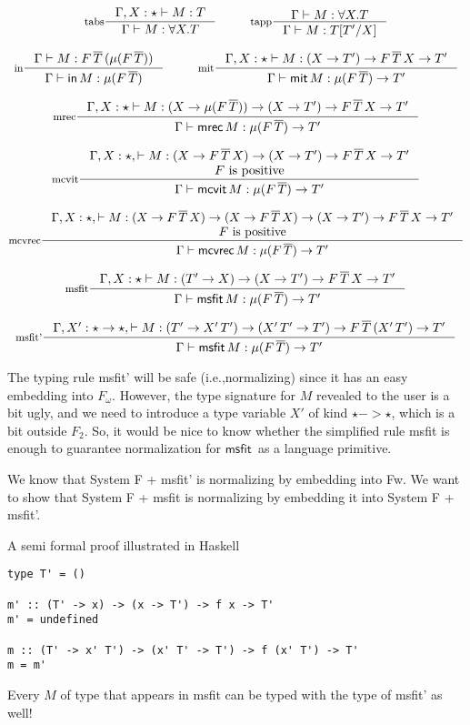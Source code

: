 \documentclass[a4paper,12pt]{book}
\newcommand{\Fw}[0]{\ensuremath{F_\omega}}
\newcommand{\ie}[0]{{i.e.},\;}
\newcommand{\miter}[0]{\ensuremath{\mathsf{mit}}}
\newcommand{\mrec}[0]{\ensuremath{\mathsf{mrec}}}
\newcommand{\mcvit}[0]{\ensuremath{\mathsf{mcvit}}}
\newcommand{\mcvrec}[0]{\ensuremath{\mathsf{mcvrec}}}
\newcommand{\msfit}[0]{\ensuremath{\mathsf{msfit}}}
\newcommand{\In}[0]{\ensuremath{\mathsf{in}}}
\begin{document}
\[ \inference[tabs]{\Gamma, X:\star |- M : T}
                   {\Gamma |- M : \forall X.T}
   ~~~~~~~~
   \inference[tapp]{\Gamma |- M : \forall X.T}
                   {\Gamma |- M : T[T'/X]}
\]

\[ \inference[in]{\Gamma |- M : F\,\overline{T}\,(\mu(F\,\overline{T}))}
                 {\Gamma |- \In\,M : \mu(F\,\overline{T})}
   ~~~~~~~~
   \inference[mit]{\Gamma, X:\star |- M : (X->T') -> F\,\overline{T}\,X -> T'}
                    {\Gamma |- \miter\,M : \mu(F\,\overline{T}) -> T'}
\]

\[
   \inference[mrec]{\Gamma, X:\star |- M : (X->\mu(F\,\overline{T})) -> (X->T') -> F\,\overline{T}\,X -> T'}
                   {\Gamma |- \mrec\,M : \mu(F\,\overline{T}) -> T'}
\]

\[ \inference[mcvit]
     { \Gamma, X:\star,
       |- M : (X->F\,\overline{T}\,X) -> (X -> T') -> F\,\overline{T}\,X -> T'
     \\ F \text{ is positive} }
     {\Gamma |- \mcvit\,M : \mu(F\,\overline{T}) -> T'}
\]

\[ \inference[mcvrec]
     { \Gamma, X:\star,
       |- M : (X->F\,\overline{T}\,X) -> (X->F\,\overline{T}\,X) -> (X -> T') -> F\,\overline{T}\,X -> T'
     \\ F \text{ is positive} }
     {\Gamma |- \mcvrec\,M : \mu(F\,\overline{T}) -> T'}
\]


\[ \inference[msfit]
     {\Gamma, X:\star |- M : (T'->X) -> (X->T') -> F\,\overline{T}\,X -> T'}
     {\Gamma |- \msfit\,M : \mu(F\,\overline{T}) -> T'}
\]

\[ \inference[msfit']
     {\Gamma, X':\star->\star,
      |- M : (T'->X'\,T') -> (X'\,T'->T') -> F\,\overline{T}\,(X'\,T') -> T'}
     {\Gamma |- \msfit\,M : \mu(F\,\overline{T}) -> T'}
\]


The typing rule msfit' will be safe (\ie normalizing) since it has an easy
embedding into \Fw. However, the type signature for $M$ revealed to the user
is a bit ugly, and we need to introduce a type variable $X'$ of kind
$\star->\star$, which is a bit outside $F_2$.
So, it would be nice to know whether the simplified rule msfit is enough
to guarantee normalization for \msfit\ as a language primitive.

We know that System F + msfit' is normalizing by embedding into Fw.
We want to show that System F + msfit is normalizing by embedding it
into System F + msfit'.

A semi formal proof illustrated in Haskell
\begin{verbatim}
type T' = ()

m' :: (T' -> x) -> (x -> T') -> f x -> T'
m' = undefined

m :: (T' -> x' T') -> (x' T' -> T') -> f (x' T') -> T'
m = m'
\end{verbatim}
Every $M$ of type that appears in msfit can be typed with the type of msfit'
as well!
\end{document}
